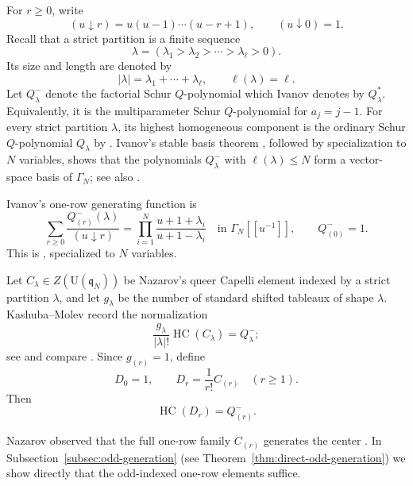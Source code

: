 \documentclass[11pt]{amsart}
\numberwithin{equation}{section}
\theoremstyle{definition}
\theoremstyle{remark}
\newcommand{\q}{\mathfrak q}
\newcommand{\U}{\mathrm U}
\newcommand{\HC}{\operatorname{HC}}
\newcommand{\fall}[2]{(#1\mathbin{\downarrow}#2)}
\begin{document}
For \(r\geq0\), write
\[
 \fall{u}{r}=u(u-1)\cdots(u-r+1),
 \qquad \fall{u}{0}=1.
\]
Recall that a strict partition is a finite sequence
\[
 \lambda=(\lambda_1>\lambda_2>\cdots>\lambda_{\ell}>0).
\]
Its size and length are denoted by
\[
 |\lambda|=\lambda_1+\cdots+\lambda_{\ell},
 \qquad
 \ell(\lambda)=\ell.
\]
Let \(Q^-_\lambda\) denote the factorial Schur \(Q\)-polynomial which
Ivanov denotes by \(Q^*_\lambda\).  Equivalently, it is the
multiparameter Schur \(Q\)-polynomial for \(a_j=j-1\).  For every
strict partition \(\lambda\), its highest homogeneous component is the
ordinary Schur \(Q\)-polynomial \(Q_\lambda\) by
\cite[Proposition~2.11]{Ivanov2005}.  Ivanov's stable basis theorem
\cite[Proposition~2.12]{Ivanov2005}, followed by specialization to
\(N\) variables, shows that the polynomials \(Q^-_\lambda\) with
\(\ell(\lambda)\leq N\) form a vector-space basis of \(\Gamma_N\); see
also \cite[Section~3]{KM2025}.

Ivanov's one-row generating function is
\begin{equation}
 \sum_{r\geq0}\frac{Q^-_{(r)}(\lambda)}{\fall{u}{r}}
 =\prod_{i=1}^N\frac{u+1+\lambda_i}{u+1-\lambda_i}
 \quad\text{in }\Gamma_N[[u^{-1}]],
 \qquad Q^-_{(0)}=1.
 \label{eq:Ivanov-one-row}
\end{equation}
This is \cite[Corollary~8.3]{Ivanov2005}, specialized to \(N\)
variables.

Let \(C_\lambda\in Z(\U(\q_N))\) be Nazarov's queer Capelli element
indexed by a strict partition \(\lambda\), and let \(g_\lambda\) be
the number of standard shifted tableaux of shape \(\lambda\).
Kashuba--Molev record the normalization
\begin{equation}
 \frac{g_\lambda}{|\lambda|!}\HC(C_\lambda)=Q^-_\lambda;
 \label{eq:capelli-HC-general}
\end{equation}
see \cite[Remark~5.4, Equation~(5.5)]{KM2025} and compare
\cite[Corollary~1.5]{ASS2018}.  Since \(g_{(r)}=1\), define
\begin{equation}
 D_0=1,\qquad D_r=\frac{1}{r!}C_{(r)}\quad(r\geq1).
 \label{eq:D-definition}
\end{equation}
Then
\begin{equation}
 \HC(D_r)=Q^-_{(r)}.
 \label{eq:D-HC}
\end{equation}

Nazarov observed that the full one-row family \(C_{(r)}\) generates the
center \cite[after Proposition~4.8]{Nazarov1997}. In Subsection~\ref{subsec:odd-generation} (see Theorem~\ref{thm:direct-odd-generation}) we show directly
that the odd-indexed one-row elements suffice.  
\end{document}
